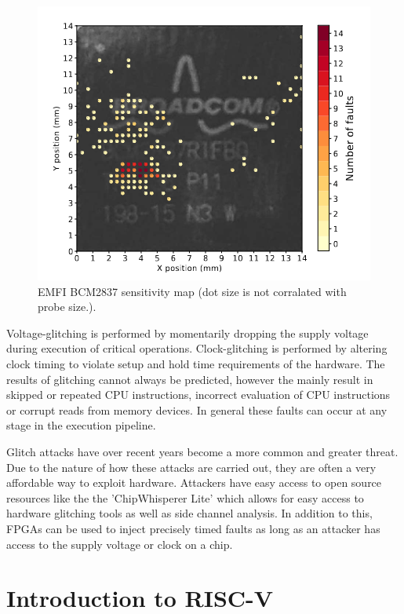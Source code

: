 \begin{figure}[h!]
    \centering
    \includegraphics[scale=0.5]{docs/images/emfi_error_map.png}
    \caption{EMFI BCM2837 sensitivity map (dot size is not corralated with probe size.)\cite{emfi_injection}.}
    \label{fig:emfi_map}
\end{figure}

Voltage-glitching is performed by momentarily dropping the supply voltage during execution of critical operations. Clock-glitching is performed by altering clock timing to violate setup and hold time requirements of the hardware\cite{intro_to_FI}. The results of glitching cannot always be predicted, however the mainly result in skipped or repeated CPU instructions, incorrect evaluation of CPU instructions or corrupt reads from memory devices\cite{intro_to_FI}. In general these faults can occur at any stage in the execution pipeline. 

Glitch attacks have over recent years become a more common and greater threat. Due to the nature of how these attacks are carried out, they are often a very affordable way to exploit hardware. Attackers have easy access to open source resources like the the 'ChipWhisperer Lite' which allows for easy access to hardware glitching tools as well as side channel analysis\cite{chipWhisperer}. In addition to this, FPGAs can be used to inject precisely timed faults as long as an attacker has access to the supply voltage or clock on a chip\cite{hole_in_soc}. 


\section{Introduction to RISC-V}
